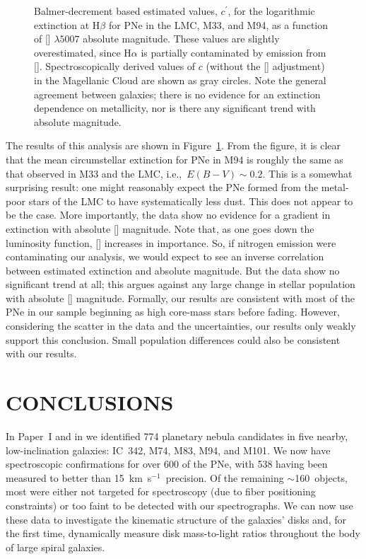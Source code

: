 \documentclass[12pt,preprint]{emulateapj}
\newcommand{\ie}{{i.e.,}}
\newcommand{\kms}{km~s$^{-1}$}
\begin{document}
\begin{figure}[t]
\caption{Balmer-decrement based estimated values, $c^{\prime}$, for the logarithmic extinction at H$\beta$ for PNe in the LMC, M33, and M94, as a function of [] $\lambda 5007$ absolute magnitude.  These values are slightly overestimated, since H$\alpha$ is partially contaminated by emission from [].  Spectroscopically derived values of $c$ (without the [] adjustment) in the Magellanic Cloud are shown as gray circles.  Note the general agreement between galaxies; there is no evidence for an extinction dependence on metallicity, nor is there any significant trend with absolute magnitude.  \label{cval} }
\end{figure}

The results of this analysis are shown in Figure~\ref{cval}.  From the figure, it is clear that the mean circumstellar extinction for PNe in M94 is roughly the same as that observed in M33 and the LMC, \ie\ $E(B-V) \sim 0.2$.  This is a somewhat surprising result:  one might reasonably expect the PNe formed from the metal-poor stars of the LMC to have systematically less dust.  This does not appear to be the case.  More importantly, the data show no evidence for a gradient in extinction with absolute [] magnitude.  Note that, as one goes down the luminosity function, [] increases in importance.  So, if nitrogen emission were contaminating our analysis, we would expect to see an inverse correlation between estimated extinction and absolute magnitude.  But the data show no significant trend at all; this argues against any large change in stellar population with absolute [] magnitude.  Formally, our results are consistent with most of the PNe in our sample beginning as high core-mass stars before fading.  However, considering the scatter in the data and the uncertainties, our results only weakly support this conclusion.  Small population differences could also be consistent with our results.

\section{CONCLUSIONS}
In Paper~I and in \citet{M101PNe} we identified 774 planetary nebula candidates in five nearby, low-inclination galaxies: IC~342, M74, M83, M94, and M101.  We now have spectroscopic confirmations for over 600 of the PNe, with 538 having been measured to better than 15~\kms\ precision.  Of the remaining $\sim$160~objects, most were either not targeted for spectroscopy (due to fiber positioning constraints) or too faint to be detected with our spectrographs.   We can now use these data to investigate the kinematic structure of the galaxies' disks and, for the first time, dynamically measure disk mass-to-light ratios throughout the body of large spiral galaxies.
\end{document}
